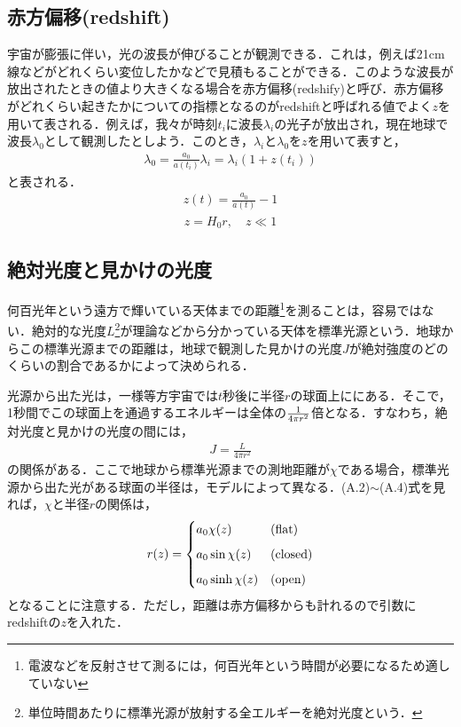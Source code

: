 \subsection{赤方偏移(redshift)}
宇宙が膨張に伴い，光の波長が伸びることが観測できる．これは，例えば21cm線などがどれくらい変位したかなどで見積もることができる．このような波長が放出されたときの値より大きくなる場合を赤方偏移(redshify)と呼び．赤方偏移がどれくらい起きたかについての指標となるのがredshiftと呼ばれる値でよく$z$を用いて表される．例えば，我々が時刻$t_i$に波長$\lambda_{i}$の光子が放出され，現在地球で波長$\lambda_{0}$として観測したとしよう．このとき，$\lambda_{i}$と$\lambda_{0}$を$z$を用いて表すと，
\begin{eqnarray}
\lambda_{0}=\frac{a_0}{a(t_{i})}\lambda_{i}=\lambda_{i}(1+z(t_i))
\end{eqnarray}
と表される．
\begin{eqnarray}
\label{Ar}
z(t)=\frac{a_0}{a(t)}-1
\end{eqnarray}
\begin{eqnarray}
z=H_{0}r,\quad z\ll1
\end{eqnarray}
\subsection{絶対光度と見かけの光度}
何百光年という遠方で輝いている天体までの距離\footnote{電波などを反射させて測るには，何百光年という時間が必要になるため適していない}を測ることは，容易ではない．絶対的な光度$L$\footnote{単位時間あたりに標準光源が放射する全エルギーを絶対光度という．}が理論などから分かっている天体を標準光源という．地球からこの標準光源までの距離は，地球で観測した見かけの光度$J$が絶対強度のどのくらいの割合であるかによって決められる．

光源から出た光は，一様等方宇宙では$t$秒後に半径$r$の球面上ににある．そこで，1秒間でこの球面上を通過するエネルギーは全体の${1\over 4\pi r^2}$倍となる．すなわち，絶対光度と見かけの光度の間には，
\begin{eqnarray}
\label{Ak}
J=\frac{L}{4\pi r^2}
\end{eqnarray}
の関係がある．ここで地球から標準光源までの測地距離が$\chi$である場合，標準光源から出た光がある球面の半径は，モデルによって異なる．(A.2)$\sim$(A.4)式を見れば，$\chi$と半径$r$の関係は，
\begin{eqnarray}
\label{A31}
r(z)=\begin{cases}
   a_{0}\chi(z)  & (\mbox{flat}) \vspace{2mm} \\
    a_0\sin\chi(z) & (\mbox{closed}) \vspace{2mm} \\
   a_0\sinh\chi(z) & (\mbox{open})
  \end{cases}
  \end{eqnarray}
となることに注意する．ただし，距離は赤方偏移からも計れるので引数にredshiftの$z$を入れた．

